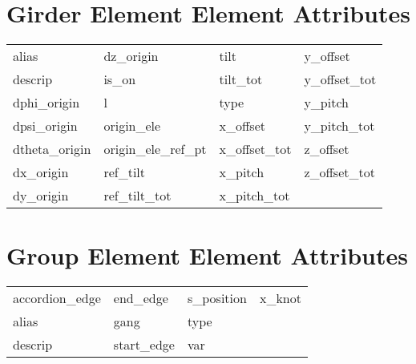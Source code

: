  \section{Girder Element Element Attributes}
 \label{s:list.girder}
 
 \begin{tabular}{llll} \toprule
alias                       & dz_origin                   & tilt                        & y_offset                    \\
descrip                     & is_on                       & tilt_tot                    & y_offset_tot                \\
dphi_origin                 & l                           & type                        & y_pitch                     \\
dpsi_origin                 & origin_ele                  & x_offset                    & y_pitch_tot                 \\
dtheta_origin               & origin_ele_ref_pt           & x_offset_tot                & z_offset                    \\
dx_origin                   & ref_tilt                    & x_pitch                     & z_offset_tot                \\
dy_origin                   & ref_tilt_tot                & x_pitch_tot                 &                             \\
 \bottomrule
 \end{tabular}
 \vfill
 
 \section{Group Element Element Attributes}
 \label{s:list.group}
 
 \begin{tabular}{llll} \toprule
accordion_edge              & end_edge                    & s_position                  & x_knot                      \\
alias                       & gang                        & type                        &                             \\
descrip                     & start_edge                  & var                         &                             \\
 \bottomrule
 \end{tabular}
 \vfill
 
